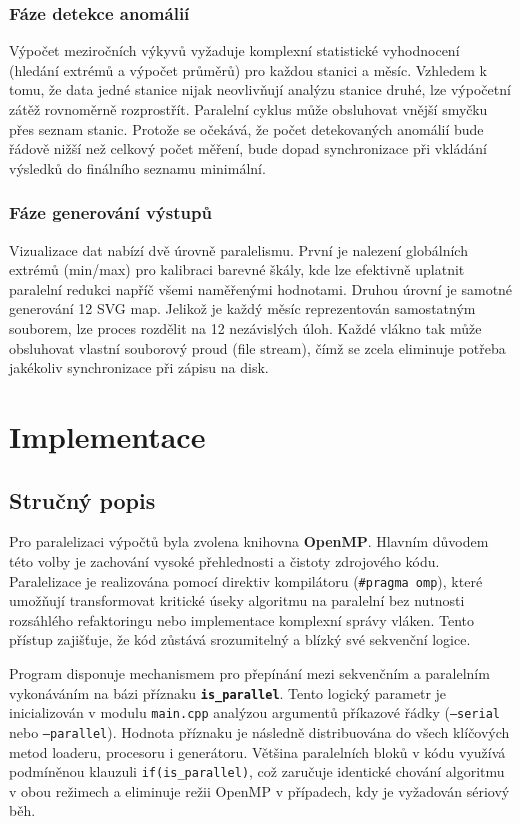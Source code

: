 \documentclass[10pt, a4paper]{report}
\begin{document}
	\subsubsection*{Fáze detekce anomálií}
	Výpočet meziročních výkyvů vyžaduje komplexní statistické vyhodnocení (hledání extrémů a výpočet průměrů) pro každou stanici a měsíc. Vzhledem k tomu, že data jedné stanice nijak neovlivňují analýzu stanice druhé, lze výpočetní zátěž rovnoměrně rozprostřít. Paralelní cyklus může obsluhovat vnější smyčku přes seznam stanic. Protože se očekává, že počet detekovaných anomálií bude řádově nižší než celkový počet měření, bude dopad synchronizace při vkládání výsledků do finálního seznamu minimální.
	
	\subsubsection*{Fáze generování výstupů}
	Vizualizace dat nabízí dvě úrovně paralelismu. První je nalezení globálních extrémů (min/max) pro kalibraci barevné škály, kde lze efektivně uplatnit paralelní redukci napříč všemi naměřenými hodnotami. Druhou úrovní je samotné generování 12 SVG map. Jelikož je každý měsíc reprezentován samostatným souborem, lze proces rozdělit na 12 nezávislých úloh. Každé vlákno tak může obsluhovat vlastní souborový proud (file stream), čímž se zcela eliminuje potřeba jakékoliv synchronizace při zápisu na disk.
	
	\section{Implementace}
	
	\subsection{Stručný popis}
	
	Pro paralelizaci výpočtů byla zvolena knihovna \textbf{OpenMP}. Hlavním důvodem této volby je zachování vysoké přehlednosti a čistoty zdrojového kódu. Paralelizace je realizována pomocí direktiv kompilátoru (\texttt{\#pragma omp}), které umožňují transformovat kritické úseky algoritmu na paralelní bez nutnosti rozsáhlého refaktoringu nebo implementace komplexní správy vláken. Tento přístup zajišťuje, že kód zůstává srozumitelný a blízký své sekvenční logice.
	
	Program disponuje mechanismem pro přepínání mezi sekvenčním a paralelním vykonáváním na bázi příznaku \textbf{\texttt{is\_parallel}}. Tento logický parametr je inicializován v modulu \texttt{main.cpp} analýzou argumentů příkazové řádky (\texttt{---serial} nebo \texttt{---parallel}). Hodnota příznaku je následně distribuována do všech klíčových metod loaderu, procesoru i generátoru. Většina paralelních bloků v kódu využívá podmíněnou klauzuli \texttt{if(is\_parallel)}, což zaručuje identické chování algoritmu v obou režimech a eliminuje režii OpenMP v případech, kdy je vyžadován sériový běh.
	
\end{document}
